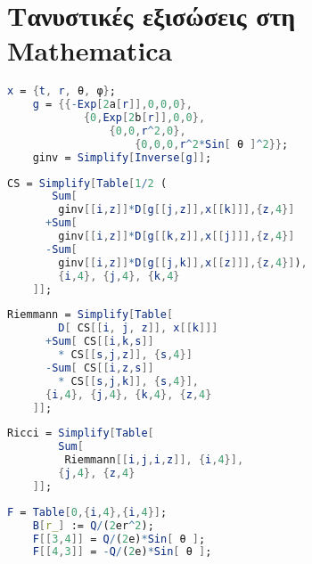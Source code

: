 \newpage
\chapter{Τανυστικές εξισώσεις στη Mathematica}\label{mathematica}

\begin{mathematica}\label{mathematica_position_n_metric}
\begin{lstlisting}[language=mathematica]
    x = {t, r, θ, φ};
    g = {{-Exp[2a[r]],0,0,0}, 
            {0,Exp[2b[r]],0,0}, 
                {0,0,r^2,0},
                    {0,0,0,r^2*Sin[ θ ]^2}};
    ginv = Simplify[Inverse[g]];
\end{lstlisting}
\end{mathematica}

\begin{mathematica}\label{mathematica_chr_symbols}
\begin{lstlisting}[language=mathematica]
    CS = Simplify[Table[1/2 (
       Sum[
        ginv[[i,z]]*D[g[[j,z]],x[[k]]],{z,4}] 
      +Sum[
        ginv[[i,z]]*D[g[[k,z]],x[[j]]],{z,4}]
      -Sum[
        ginv[[i,z]]*D[g[[j,k]],x[[z]]],{z,4}]),
        {i,4}, {j,4}, {k,4}
    ]];
\end{lstlisting}
\end{mathematica}

\begin{mathematica}\label{mathematica_Riemann}
\begin{lstlisting}[language=mathematica]
    Riemmann = Simplify[Table[
        D[ CS[[i, j, z]], x[[k]]] 
      +Sum[ CS[[i,k,s]]
        * CS[[s,j,z]], {s,4}] 
      -Sum[ CS[[i,z,s]]
        * CS[[s,j,k]], {s,4}],
      {i,4}, {j,4}, {k,4}, {z,4}
    ]];
\end{lstlisting}
\end{mathematica}

\begin{mathematica}\label{mathematica_Ricci}
\begin{lstlisting}[language=mathematica]
    Ricci = Simplify[Table[
        Sum[
         Riemmann[[i,j,i,z]], {i,4}], 
        {j,4}, {z,4}
    ]]; 
\end{lstlisting}
\end{mathematica}

\newpage
\begin{mathematica}\label{mathematica_emtensor}
\begin{lstlisting}[language=mathematica]
    F = Table[0,{i,4},{i,4}];
    B[r_] := Q/(2er^2); 
    F[[3,4]] = Q/(2e)*Sin[ θ ];
    F[[4,3]] = -Q/(2e)*Sin[ θ ];
\end{lstlisting}
\end{mathematica}

